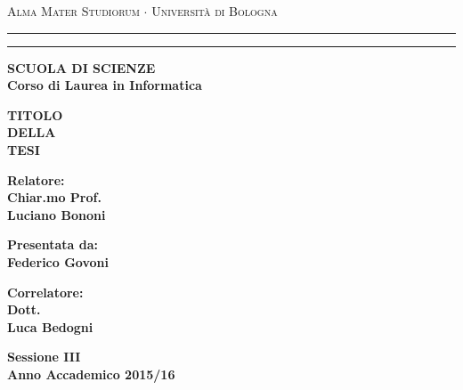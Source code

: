 \documentclass[12pt,a4paper]{report}
\begin{document}
\begin{titlepage}
\begin{center}
{{\Large{\textsc{Alma Mater Studiorum $\cdot$ Universit\`a di
Bologna}}}} \rule[0.1cm]{15.8cm}{0.1mm}
\rule[0.5cm]{15.8cm}{0.6mm}
{\small{\bf SCUOLA DI SCIENZE\\
Corso di Laurea in Informatica }}
\end{center}
\vspace{15mm}
\begin{center}
{\LARGE{\bf TITOLO}}\\
\vspace{3mm}
{\LARGE{\bf DELLA}}\\
\vspace{3mm}
{\LARGE{\bf TESI}}\\
\end{center}
\vspace{40mm}
\par
\noindent
\begin{minipage}[t]{0.47\textwidth}
{\large{\bf Relatore:\\
Chiar.mo Prof.\\
Luciano Bononi}}
\end{minipage}
\hfill
\begin{minipage}[t]{0.47\textwidth}\raggedleft
{\large{\bf Presentata da:\\
Federico Govoni}}
\end{minipage}
\vspace{8mm}
\par
\noindent
\begin{minipage}[t]{0.47\textwidth}
{\large{\bf Correlatore:\\
Dott.\\
Luca Bedogni}}
\end{minipage}
\vspace{20mm}
\begin{center}
{\large{\bf Sessione III\\%
Anno Accademico 2015/16}}%
\end{center}
\end{titlepage}
\end{document}
